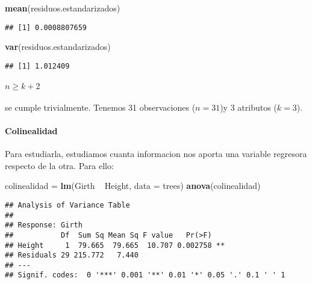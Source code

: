\documentclass[]{article}
\newenvironment{Shaded}{\begin{snugshade}}{\end{snugshade}}
\newcommand{\KeywordTok}[1]{\textcolor[rgb]{0.13,0.29,0.53}{\textbf{{#1}}}}
\newcommand{\DataTypeTok}[1]{\textcolor[rgb]{0.13,0.29,0.53}{{#1}}}
\newcommand{\StringTok}[1]{\textcolor[rgb]{0.31,0.60,0.02}{{#1}}}
\newcommand{\NormalTok}[1]{{#1}}
\begin{document}
\begin{Shaded}
\begin{Highlighting}[]
\KeywordTok{mean}\NormalTok{(residuos.estandarizados)}
\end{Highlighting}
\end{Shaded}

\begin{verbatim}
## [1] 0.0008807659
\end{verbatim}

\begin{Shaded}
\begin{Highlighting}[]
\KeywordTok{var}\NormalTok{(residuos.estandarizados)}
\end{Highlighting}
\end{Shaded}

\begin{verbatim}
## [1] 1.012409
\end{verbatim}

\paragraph{$n \geq k+2$}

se cumple trivialmente. Tenemos 31 observaciones (\(n=31\))y 3 atributos
(\(k=3\)).

\paragraph{Colinealidad}

Para estudiarla, estudiamos cuanta informacion nos aporta una variable
regresora respecto de la otra. Para ello:

\begin{Shaded}
\begin{Highlighting}[]
\NormalTok{colinealidad =}\StringTok{ }\KeywordTok{lm}\NormalTok{(Girth ~}\StringTok{ }\NormalTok{Height, }\DataTypeTok{data =} \NormalTok{trees)}
\KeywordTok{anova}\NormalTok{(colinealidad)}
\end{Highlighting}
\end{Shaded}

\begin{verbatim}
## Analysis of Variance Table
## 
## Response: Girth
##           Df  Sum Sq Mean Sq F value   Pr(>F)   
## Height     1  79.665  79.665  10.707 0.002758 **
## Residuals 29 215.772   7.440                    
## ---
## Signif. codes:  0 '***' 0.001 '**' 0.01 '*' 0.05 '.' 0.1 ' ' 1
\end{verbatim}
\end{document}
